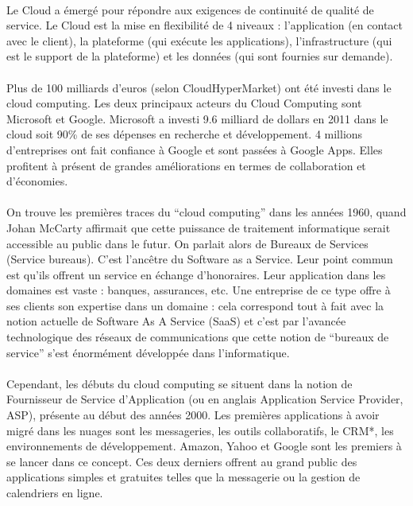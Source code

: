 \documentclass[a4paper,12pt]{report}
\begin{document}
\begin{onehalfspace}
	\paragraph*{}
	Le Cloud a émergé pour répondre aux exigences de continuité de qualité de service. Le Cloud est la mise en flexibilité de 4 niveaux : l’application (en contact avec le client), la plateforme (qui exécute les applications), l’infrastructure (qui est le support de la plateforme) et les données (qui sont fournies sur demande).
	
	\paragraph*{}
	Plus de 100 milliards d’euros (selon CloudHyperMarket) ont été investi dans le cloud computing. Les deux principaux acteurs du Cloud Computing sont Microsoft et Google. Microsoft a investi 9.6 milliard de dollars en 2011 dans le cloud soit 90\% de ses dépenses en recherche et développement. 4 millions d’entreprises ont fait confiance à Google et sont passées à Google Apps. Elles profitent à présent de grandes améliorations en termes de collaboration et d'économies.
	
	\paragraph*{}
	On trouve les premières traces du “cloud computing” dans les années 1960, quand Johan McCarty affirmait que cette puissance de traitement informatique serait accessible au public dans le futur. On parlait alors de Bureaux de Services (Service bureaus). C’est l’ancêtre du Software as a Service. Leur point commun est qu’ils offrent un service en échange d’honoraires. Leur application dans les domaines est vaste : banques, assurances, etc. Une entreprise de ce type offre à ses clients son expertise dans un domaine : cela correspond tout à fait avec la notion actuelle de Software As A Service (SaaS) et c’est par l’avancée technologique des réseaux de communications que cette notion de “bureaux de service”  s’est énormément développée dans l’informatique.
	
	\paragraph*{}
	Cependant, les débuts du cloud computing se situent dans la notion de Fournisseur de Service d’Application (ou en anglais Application Service Provider, ASP), présente au début des années 2000. Les premières applications à avoir migré dans les nuages sont les messageries, les outils collaboratifs, le CRM*, les environnements de développement. Amazon, Yahoo et Google sont les premiers à se lancer dans ce concept. Ces deux derniers offrent au grand public des applications simples et gratuites telles que la messagerie ou la gestion de calendriers en ligne.
	

\end{onehalfspace}
\end{document}
